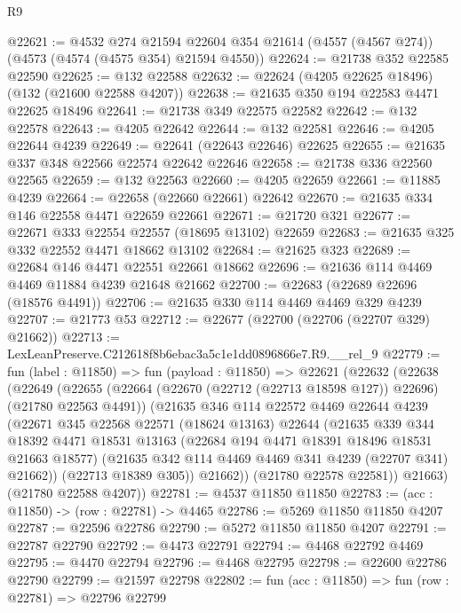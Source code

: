 \begin{lexlean}{R9}
\begin{coremodule}
@22621 := @4532
    @274
    @21594
    @22604
    @354
    @21614
    (@4557 (@4567 @274))
    (@4573 (@4574 (@4575 @354) @21594 @4550))
@22624 := @21738 @352 @22585 @22590
@22625 := @132 @22588
@22632 := @22624 (@4205 @22625 @18496) (@132 (@21600 @22588 @4207))
@22638 := @21635 @350 @194 @22583 @4471 @22625 @18496
@22641 := @21738 @349 @22575 @22582
@22642 := @132 @22578
@22643 := @4205 @22642
@22644 := @132 @22581
@22646 := @4205 @22644 @4239
@22649 := @22641 (@22643 @22646) @22625
@22655 := @21635 @337 @348 @22566 @22574 @22642 @22646
@22658 := @21738 @336 @22560 @22565
@22659 := @132 @22563
@22660 := @4205 @22659
@22661 := @11885 @4239
@22664 := @22658 (@22660 @22661) @22642
@22670 := @21635 @334 @146 @22558 @4471 @22659 @22661
@22671 := @21720 @321
@22677 := @22671 @333 @22554 @22557 (@18695 @13102) @22659
@22683 := @21635 @325 @332 @22552 @4471 @18662 @13102
@22684 := @21625 @323
@22689 := @22684 @146 @4471 @22551 @22661 @18662
@22696 := @21636 @114 @4469 @4469 @11884 @4239 @21648 @21662
@22700 := @22683 (@22689 @22696 (@18576 @4491))
@22706 := @21635 @330 @114 @4469 @4469 @329 @4239
@22707 := @21773 @53
@22712 := @22677 (@22700 (@22706 (@22707 @329) @21662))
@22713 := LexLeanPreserve.C212618f8b6ebac3a5c1e1dd0896866e7.R9.__rel_9
@22779 := fun (label : @11850) =>
  fun (payload : @11850) =>
  @22621
    (@22632
      (@22638
        (@22649
          (@22655
            (@22664 (@22670 (@22712 (@22713 @18598 @127)) @22696) (@21780 @22563 @4491))
            (@21635
              @346
              @114
              @22572
              @4469
              @22644
              @4239
              (@22671
                @345
                @22568
                @22571
                (@18624 @13163)
                @22644
                (@21635
                  @339
                  @344
                  @18392
                  @4471
                  @18531
                  @13163
                  (@22684 @194 @4471 @18391 @18496 @18531 @21663 @18577)
                  (@21635 @342 @114 @4469 @4469 @341 @4239 (@22707 @341) @21662))
                (@22713 @18389 @305))
              @21662))
          (@21780 @22578 @22581))
        @21663)
      (@21780 @22588 @4207))
@22781 := @4537 @11850 @11850
@22783 := (acc : @11850) -> (row : @22781) -> @4465
@22786 := @5269 @11850 @11850 @4207
@22787 := @22596 @22786
@22790 := @5272 @11850 @11850 @4207
@22791 := @22787 @22790
@22792 := @4473 @22791
@22794 := @4468 @22792 @4469
@22795 := @4470 @22794
@22796 := @4468 @22795
@22798 := @22600 @22786 @22790
@22799 := @21597 @22798
@22802 := fun (acc : @11850) => fun (row : @22781) => @22796 @22799

\end{coremodule}
\end{lexlean}
